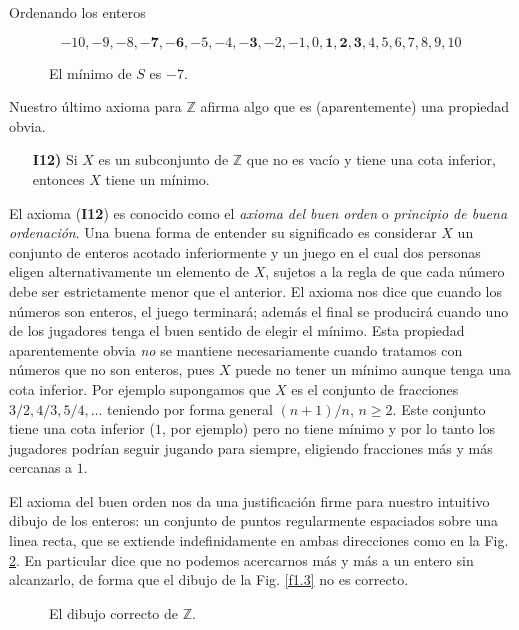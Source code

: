 \begin{section}{Ordenando los enteros}


\begin{figure}[ht]
$$
-10, -9, -8, \mathbf{-7}, \mathbf{-6}, -5, -4, \mathbf{-3}, -2, -1, 0, \mathbf{1}, \mathbf{2}, \mathbf{3}, 
4, 5, 6, 7, 8, 9, 10
$$
\caption{El mínimo de $S$ es $-7$.}\label{f1.1}
\end{figure}


Nuestro último axioma para $\mathbb Z$ afirma algo que es (aparentemente) una propiedad obvia.

\begin{enumerate}
\item[\textbf{I12)}] Si $X$ es un subconjunto de $\mathbb Z$ que no es vacío y tiene una cota inferior, entonces $X$ tiene un mínimo.
\end{enumerate}

El axioma (\textbf{I12}) es conocido como el {\em axioma del buen orden} o {\em principio de buena ordenación}.  Una buena forma de entender su significado es considerar $X$ un conjunto de enteros acotado inferiormente  y un juego en el cual dos personas eligen alternativamente un elemento de $X$, sujetos a la regla de que cada número debe ser estrictamente menor que el anterior. El axioma nos dice que cuando los números son enteros, el juego terminará; además el final se producirá cuando uno de los jugadores tenga el buen sentido de elegir el mínimo. Esta propiedad aparentemente obvia \textit{no} se mantiene necesariamente cuando tratamos con números que no son enteros, pues $X$ puede no tener un mínimo aunque tenga una cota inferior. Por ejemplo supongamos que $X$ es el conjunto de fracciones $3/2, 4/3, 5/4, \ldots$ teniendo por forma general $(n+1)/n$, $n\ge 2$. Este conjunto tiene una cota inferior ($1$, por ejemplo) pero no tiene mínimo y por lo tanto los jugadores podrían seguir jugando para siempre, eligiendo fracciones más y más cercanas a $1$.

El axioma del buen orden nos da una justificación firme para nuestro intuitivo dibujo de los enteros: un conjunto de puntos regularmente espaciados sobre una linea recta, que se extiende indefinidamente en ambas direcciones como en la Fig. \ref{f1.2}. En particular dice que no podemos acercarnos más y más a un entero sin alcanzarlo, de forma que el dibujo de la Fig. \ref{f1.3} no es correcto.

\begin{figure}[ht]
    \begin{center}
    \end{center}
    \caption{El dibujo correcto de $\mathbb Z$.}\label{f1.2}
\end{figure}


\end{section}
